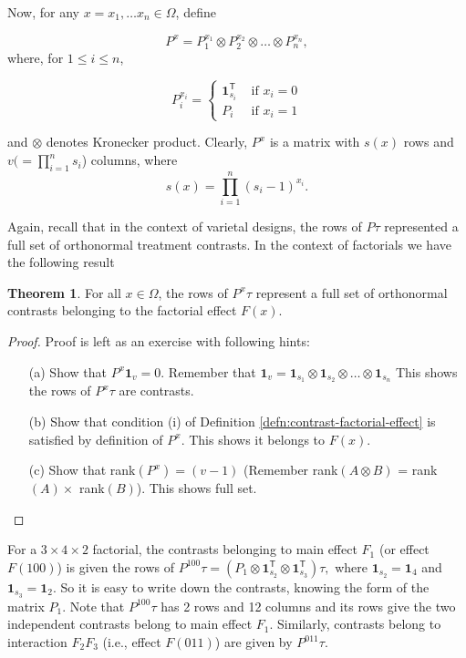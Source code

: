 \documentclass[12pt]{article}
\newcommand{\transpose}{\mathsf{T}}
\theoremstyle{definition}
\newtheorem{thm}{Theorem}
\newenvironment{theorem}{
\begin{tcolorbox}[colback=green!5!white,colframe=green!75!black, parbox = false]\begin{thm} }{\end{thm}\end{tcolorbox} }
\newenvironment{example}[1][\unskip]{
\begin{tcolorbox}[colback=blue!5!white,colframe=blue!75!black, title = {Example #1}, parbox = false] }{\end{tcolorbox} }
\begin{document}
Now, for any $x=x_1, \ldots x_n \in \Omega$, define 

$$P^x =P_1^{x_1} \otimes P_2^{x_2} \otimes \ldots \otimes P_n^{x_n},$$
where, for $1\leq i \leq n$,

$$
P_i^{x_i} = \begin{cases}
\mathbf{1}_{s_i}^{\transpose} & \text{ if } x_i = 0\\
P_i & \text{ if } x_i = 1
\end{cases}
$$

and $\otimes$ denotes Kronecker product. Clearly, $P^x$ is a matrix with $s(x)$ rows and $v(=\prod_{i=1}^n s_i$) columns, where 
$$ s(x) = \prod_{i=1}^n (s_i-1)^{x_i}.$$
 
Again, recall that in the context of varietal designs,  the rows of $P\tau$ represented a full set of orthonormal treatment contrasts. In the context of factorials we have the following result

\begin{theorem}
    For all $x \in \Omega$, the rows of $P^x\tau$ represent a full set of orthonormal contrasts belonging to the factorial effect $F(x)$.
    \label{thm:result1-note3}
\end{theorem}
 
\begin{proof}
    Proof is left as an exercise with following hints:
    \begin{enumerate}
        \item[(a)] Show that $P^x \mathbf{1}_v = 0$. 
        Remember that $\mathbf{1}_v = \mathbf{1}_{s_1}\otimes  \mathbf{1}_{s_2} \otimes \ldots \otimes  \mathbf{1}_{s_n}$
        This shows the rows of $P^x\tau$ are contrasts.
        \item[(b)] Show that condition (i) of Definition \ref{defn:contrast-factorial-effect} is satisfied by definition of $P^x$. This shows it belongs to $F(x)$.
        \item[(c)] Show that rank$(P^x) = (v-1)$ (Remember rank$(A\otimes B )$ = rank $(A)\times$ rank$(B)$). This shows full set.
    \end{enumerate}
\end{proof}

\begin{example}
    For a $3\times 4\times 2$ factorial, the contrasts belonging to main effect $F_1$ (or effect $F(100)$) is given the rows of  $P^{100} \tau = (P_1\otimes \mathbf{1}^{\transpose}_{s_2} \otimes \mathbf{1}^{\transpose}_{s_3})\tau, $ where $\mathbf{1}_{s_2}= \mathbf{1}_4$ and  $\mathbf{1}_{s_3}= \mathbf{1}_2$.  So it is easy to write down the contrasts, knowing the form of the matrix $P_1$. Note that  $P^{100} \tau$ has 2 rows and 12 columns and its rows give the two independent contrasts belong to main effect $F_1.$ Similarly, contrasts belong to interaction $F_2F_3$ (i.e.,  effect $F(011)$) are given by  $P^{011} \tau$.
    \label{example:factorial-1}
\end{example}
\end{document}
